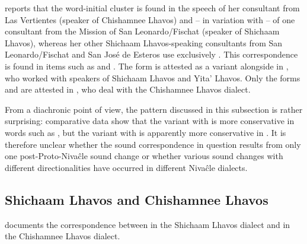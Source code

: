 \citet[534--535]{NS87} reports that the word-initial cluster  is found in the speech of her consultant from Las Vertientes (speaker of Chishamnee Lhavos) and – in variation with  – of one consultant from the Mission of San Leonardo/Fischat (speaker of Shichaam Lhavos), whereas her other Shichaam Lhavos-speaking consultants from San Leonardo/Fischat and San José de Esteros use exclusively . This correspondence is found in items such as  and . The form  is attested as a variant alongside  in \citet[231]{AnG15}, who worked with speakers of Shichaam Lhavos and Yita' Lhavos. Only the forms  and  are attested in \citet{LC20}, who deal with the Chishamnee Lhavos dialect.

From a diachronic point of view, the pattern discussed in this subsection is rather surprising: comparative data show that the variant with  is more conservative in words such as , but the variant with  is apparently more conservative in . It is therefore unclear whether the sound correspondence in question results from only one post-Proto-Nivaĉle sound change or whether various sound changes with different directionalities have occurred in different Nivaĉle dialects.

\subsection{Shichaam Lhavos  and Chishamnee Lhavos } \label{ni-chishamnee-lowering}

\citet[124--125, 162, 498, 504, 514, 521, 526]{NS87} documents the correspondence between  in the Shichaam Lhavos dialect and  in the Chishamnee Lhavos dialect.

\ea
    \begin{xlist}
        \ex {} \recind {}
        \ex {} \recind {}\label{jpec}
        \ex {} \recind {}\label{tpic}
        \ex {} \recind {}
        \ex {} \recind {}
        \ex {} \recind {}
    \end{xlist}
\z

